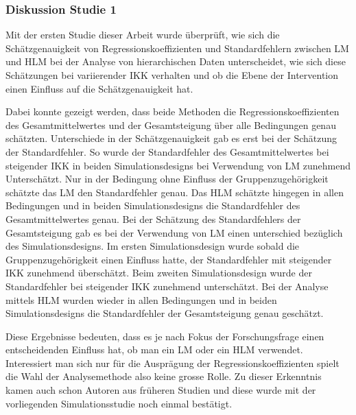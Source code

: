 \documentclass[12pt]{article}\usepackage[]{graphicx}\usepackage[]{color}
\begin{document}
\subsubsection{Diskussion Studie 1}
Mit der ersten Studie dieser Arbeit wurde überprüft, wie sich die Schätzgenauigkeit von Regressionskoeffizienten und Standardfehlern zwischen LM und HLM bei der Analyse von hierarchischen Daten unterscheidet, wie sich diese Schätzungen bei variierender IKK verhalten und ob die Ebene der Intervention einen Einfluss auf die Schätzgenauigkeit hat. 

Dabei konnte gezeigt werden, dass beide Methoden die Regressionskoeffizienten des Gesamtmittelwertes und der Gesamtsteigung über alle Bedingungen genau schätzten. Unterschiede in der Schätzgenauigkeit gab es erst bei der Schätzung der Standardfehler. So wurde der Standardfehler des Gesamtmittelwertes bei steigender IKK in beiden Simulationsdesigns bei Verwendung von LM zunehmend Unterschätzt. Nur in der Bedingung ohne Einfluss der Gruppenzugehörigkeit schätzte das LM den Standardfehler genau. Das HLM schätzte hingegen in allen Bedingungen und in beiden Simulationsdesigns die Standardfehler des Gesamtmittelwertes genau. Bei der Schätzung des Standardfehlers der Gesamtsteigung gab es bei der Verwendung von LM einen unterschied bezüglich des Simulationsdesigns. Im ersten Simulationsdesign wurde sobald die Gruppenzugehörigkeit einen Einfluss hatte, der Standardfehler mit steigender IKK zunehmend überschätzt. Beim zweiten Simulationsdesign wurde der Standardfehler bei steigender IKK zunehmend unterschätzt. Bei der Analyse mittels HLM wurden wieder in allen Bedingungen und in beiden Simulationsdesigns die Standardfehler der Gesamtsteigung genau geschätzt.

Diese Ergebnisse bedeuten, dass es je nach Fokus der Forschungsfrage einen entscheidenden Einfluss hat, ob man ein LM oder ein HLM verwendet. Interessiert man sich nur für die Ausprägung der Regressionskoeffizienten spielt die Wahl der Analysemethode also keine grosse Rolle. Zu dieser Erkenntnis kamen auch schon Autoren aus früheren Studien \citep{mcneish2014analyzing, mundfrom2002monte, osborne2000advantages} und diese wurde mit der vorliegenden Simulationsstudie noch einmal bestätigt. 
\end{document}
